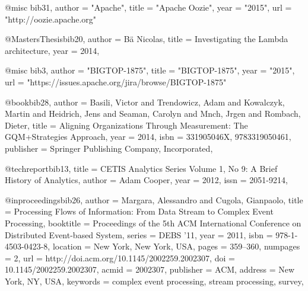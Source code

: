@misc{ bib31,
   author = "Apache",
   title = "Apache Oozie",
   year = "2015",
   url = "http://oozie.apache.org"
 }
 
 @MastersThesis{bib20,
    author     =     {B\"{a} Nicolas},
    title     =     {{Investigating the Lambda architecture}},
    year     =     {2014},
    }
    
 @misc{ bib3,
   author = "BIGTOP-1875",
   title = "BIGTOP-1875",
   year = "2015",
   url = "https://issues.apache.org/jira/browse/BIGTOP-1875"
 }
 
 
 @book{bib28,
 author = {Basili, Victor and Trendowicz, Adam and Kowalczyk, Martin and Heidrich, Jens and Seaman, Carolyn and Mnch, Jrgen and Rombach, Dieter},
 title = {Aligning Organizations Through Measurement: The GQM+Strategies Approach},
 year = {2014},
 isbn = {331905046X, 9783319050461},
 publisher = {Springer Publishing Company, Incorporated},
} 

 @techreport{bib13,
     title = {{CETIS Analytics Series Volume 1, No 9: A Brief History of Analytics}},
     author = {Adam Cooper},
     year = {2012},
     issn = {2051-9214},
}

@inproceedings{bib26,
 author = {Margara, Alessandro and Cugola, Gianpaolo},
 title = {Processing Flows of Information: From Data Stream to Complex Event Processing},
 booktitle = {Proceedings of the 5th ACM International Conference on Distributed Event-based System},
 series = {DEBS '11},
 year = {2011},
 isbn = {978-1-4503-0423-8},
 location = {New York, New York, USA},
 pages = {359--360},
 numpages = {2},
 url = {http://doi.acm.org/10.1145/2002259.2002307},
 doi = {10.1145/2002259.2002307},
 acmid = {2002307},
 publisher = {ACM},
 address = {New York, NY, USA},
 keywords = {complex event processing, stream processing, survey},
} 




